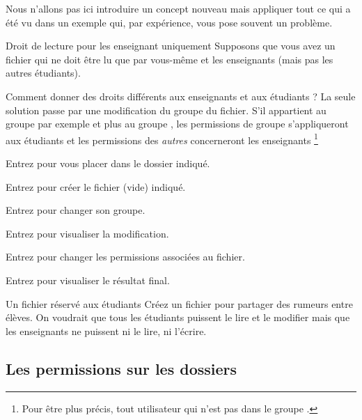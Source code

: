 \documentclass[a4paper,11pt]{style-esi/td}
\begin{document}
		\begin{alertbox}
			Nous n'allons pas ici introduire un concept nouveau
			mais appliquer tout ce qui a été vu dans un exemple
			qui, par expérience, vous pose souvent un problème. 
		\end{alertbox}

		\begin{Tutoriel}{Droit de lecture pour les enseignant uniquement}
			Supposons que vous avez un fichier qui ne doit être
			lu que par vous-même et les enseignants (mais pas les autres étudiants).

			Comment donner des droits différents aux enseignants et aux étudiants ?
			La seule solution passe par une modification du groupe du fichier.
			S'il appartient au groupe  par exemple
			et plus au groupe , les permissions de groupe
			s'appliqueront aux étudiants et les permissions des \emph{autres}
			concerneront les enseignants%
			\footnote{
				Pour être plus précis, 
				tout utilisateur qui n'est pas dans le groupe .
			}

			\begin{steps}
			\item 
				Entrez 
				pour vous placer dans le dossier indiqué.
			\item 
				Entrez  
				pour créer le fichier (vide) indiqué.
			\item 
				Entrez 
				pour changer son groupe.
			\item 
				Entrez  pour visualiser la modification.
			\item 
				Entrez 
				pour changer les permissions associées au fichier.
			\item 
				Entrez  pour visualiser le résultat final.
			\end{steps}
		\end{Tutoriel}

		\begin{Exercice}{Un fichier réservé aux étudiants}
			Créez un fichier 
			pour partager des rumeurs entre élèves.
			On voudrait que tous les étudiants puissent le lire et le modifier
			mais que les enseignants ne puissent ni le lire, ni l'écrire.
		\end{Exercice}

	\subsection{Les permissions sur les dossiers}
\end{document}
